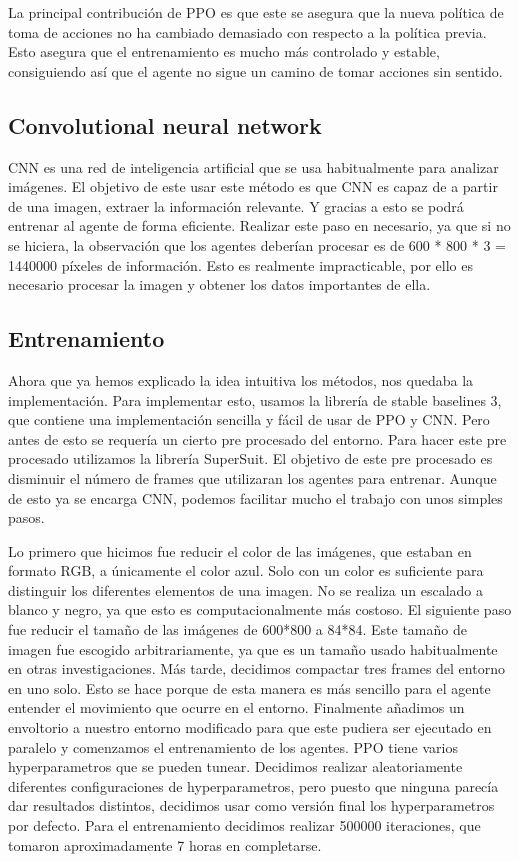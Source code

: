 La principal contribución de PPO es que este se asegura que la nueva política de toma de acciones no ha cambiado demasiado con respecto a la política previa. Esto asegura que el entrenamiento es mucho más controlado y estable, consiguiendo así que el agente no sigue un camino de tomar acciones sin sentido.

\subsection*{Convolutional neural network}

CNN es una red de inteligencia artificial que se usa habitualmente para analizar imágenes. El objetivo de este usar este método es que CNN es capaz de a partir de una imagen, extraer la información relevante. Y gracias a esto se podrá entrenar al agente de forma eficiente. Realizar este paso en necesario, ya que si no se hiciera, la observación que los agentes deberían procesar es de 600 * 800 * 3 = 1440000 píxeles de información. Esto es realmente impracticable, por ello es necesario procesar la imagen y obtener los datos importantes de ella.

\subsection*{Entrenamiento}

Ahora que ya hemos explicado la idea intuitiva los métodos, nos quedaba la implementación. Para implementar esto, usamos la librería de stable baselines 3, que contiene una implementación sencilla y fácil de usar de PPO y CNN. Pero antes de esto se requería un cierto pre procesado del entorno. Para hacer este pre procesado utilizamos la librería SuperSuit. El objetivo de este pre procesado es disminuir el número de frames que utilizaran los agentes para entrenar. Aunque de esto ya se encarga CNN, podemos facilitar mucho el trabajo con unos simples pasos. 

Lo primero que hicimos fue reducir el color de las imágenes, que estaban en formato RGB, a únicamente el color azul. Solo con un color es suficiente para distinguir los diferentes elementos de una imagen. No se realiza un escalado a blanco y negro, ya que esto es computacionalmente más costoso. El siguiente paso fue reducir el tamaño de las imágenes de 600*800 a 84*84. Este tamaño de imagen fue escogido arbitrariamente, ya que es un tamaño usado habitualmente en otras investigaciones. Más tarde, decidimos compactar tres frames del entorno en uno solo. Esto se hace porque de esta manera es más sencillo para el agente entender el movimiento que ocurre en el entorno. Finalmente añadimos un envoltorio a nuestro entorno modificado para que este pudiera ser ejecutado en paralelo y comenzamos el entrenamiento de los agentes. PPO tiene varios hyperparametros que se pueden tunear. Decidimos realizar aleatoriamente diferentes configuraciones de hyperparametros, pero puesto que ninguna parecía dar resultados distintos, decidimos usar como versión final los hyperparametros por defecto. Para el entrenamiento decidimos realizar 500000 iteraciones, que tomaron aproximadamente 7 horas en completarse.

